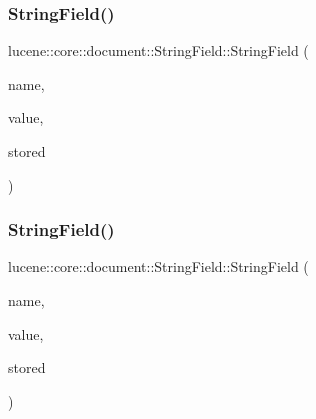 \mbox{\label{classlucene_1_1core_1_1document_1_1StringField_ac1d3b420656ad92b14efb3c9c955d8a1}} 
\subsubsection{\texorpdfstring{String\+Field()}{StringField()}\hspace{0.1cm}{\footnotesize\ttfamily [3/4]}}
{\footnotesize\ttfamily lucene\+::core\+::document\+::\+String\+Field\+::\+String\+Field (\begin{DoxyParamCaption}\item[{const std\+::string \&}]{name,  }\item[{const \mbox{\hyperlink{classlucene_1_1core_1_1util_1_1BytesRef}{lucene\+::core\+::util\+::\+Bytes\+Ref}} \&}]{value,  }\item[{const \mbox{\hyperlink{classlucene_1_1core_1_1document_1_1Field_a7d5d79f0c56d3548ab8d46d0e7dae35d}{Field\+::\+Store}}}]{stored }\end{DoxyParamCaption})\hspace{0.3cm}{\ttfamily [inline]}}

\mbox{\label{classlucene_1_1core_1_1document_1_1StringField_a33a7cc4352b3c8740bcca051c2ee3021}} 
\subsubsection{\texorpdfstring{String\+Field()}{StringField()}\hspace{0.1cm}{\footnotesize\ttfamily [4/4]}}
{\footnotesize\ttfamily lucene\+::core\+::document\+::\+String\+Field\+::\+String\+Field (\begin{DoxyParamCaption}\item[{const std\+::string \&}]{name,  }\item[{\mbox{\hyperlink{classlucene_1_1core_1_1util_1_1BytesRef}{lucene\+::core\+::util\+::\+Bytes\+Ref}} \&\&}]{value,  }\item[{const \mbox{\hyperlink{classlucene_1_1core_1_1document_1_1Field_a7d5d79f0c56d3548ab8d46d0e7dae35d}{Field\+::\+Store}}}]{stored }\end{DoxyParamCaption})\hspace{0.3cm}{\ttfamily [inline]}}

